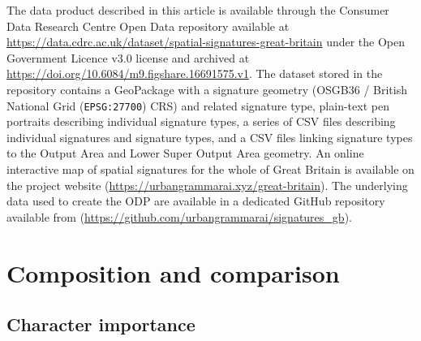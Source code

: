 \documentclass[fleqn,10pt]{wlscirep}
\begin{document}
The data product described in this article is available through the Consumer Data
Research Centre Open Data repository available at
\hyperlink{https://data.cdrc.ac.uk/dataset/spatial-signatures-great-britain}{https://data.cdrc.ac.uk/dataset/spatial-signatures-great-britain}
under the Open Government Licence v3.0 license and archived at
\hyperlink{https://doi.org/10.6084/m9.figshare.16691575.v1}{https://doi.org/10.6084/m9.figshare.16691575.v1}.
The dataset stored in the repository contains a GeoPackage with a signature geometry
(OSGB36 / British National Grid (\texttt{EPSG:27700}) CRS) and related signature type,
plain-text pen portraits describing individual signature types, a series of CSV files
describing individual signatures and signature types, and a CSV files linking signature
types to the Output Area and Lower Super Output Area geometry. An online interactive map
of spatial signatures for the whole of Great Britain is available on the project website
(\hyperlink{https://urbangrammarai.xyz/great-britain}{https://urbangrammarai.xyz/great-britain}).
The underlying data used to create the ODP are available in a dedicated GitHub repository
available from (\hyperlink{https://github.com/urbangrammarai/signatures\_gb}{https://github.com/urbangrammarai/signatures\_gb}).


\section*{Composition and comparison}


\subsection*{Character importance}
\end{document}
